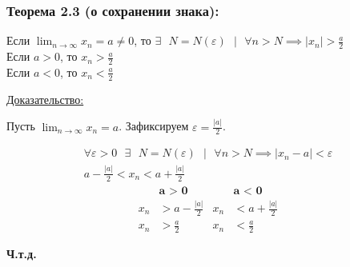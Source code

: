 \documentclass[12pt]{article}
\begin{document}
    \subsubsection*{Теорема 2.3 (о сохранении знака):}
    \begin{adjustwidth}{1.5em}{1.5em}
        Если $\lim_{n\to\infty}x_n = a \ne 0$, то $\exists \text{ } N = N(\varepsilon) \text{ } \big| \text{ } \forall n > N \implies |x_n| > \frac{a}{2}$\\
        Если $a > 0$, то $x_n > \frac{a}{2}$\\
        Если $a < 0$, то $x_n < \frac{a}{2}$    
    \end{adjustwidth}
    \underline{Доказательство:} 
    \begin{adjustwidth}{1.5em}{1.5em}
        Пусть $\lim_{n\to\infty} x_n = a$. Зафиксируем $\varepsilon = \frac{|a|}{2}$.
    \end{adjustwidth}
    \begin{gather*}
        \forall \varepsilon > 0 \text{ } \exists \text{ } N = N(\varepsilon) \text{ } \big| \text{ } \forall n > N \implies |x_n - a| < \varepsilon\\
        a - \frac{|a|}{2} < x_n < a + \frac{|a|}{2}
    \end{gather*}
    \begin{align*}
        &\textbf{a > 0} & &\textbf{a < 0}\\
        x_n &> a - \frac{|a|}{2} & x_n &< a + \frac{|a|}{2}\\
        x_n &> \frac{a}{2} & x_n &< \frac{a}{2}
    \end{align*}
    \begin{center}
        \textbf{Ч.т.д.}
    \end{center}
\end{document}
